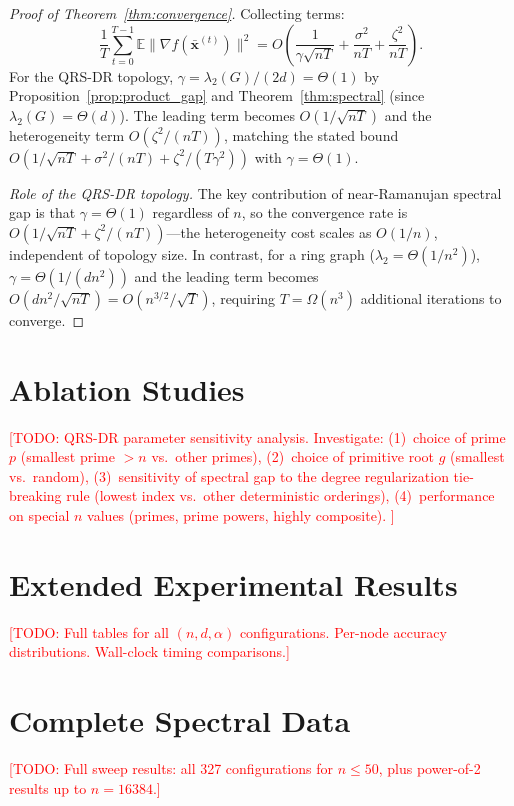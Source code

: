 \documentclass{article}
\newcommand{\E}{\mathbb{E}}
\newcommand{\bx}{\mathbf{x}}
\newcommand{\lam}{\lambda_2}
\begin{document}
\begin{proof}[Proof of Theorem~\ref{thm:convergence}]
Collecting terms:
\[
\frac{1}{T}\sum_{t=0}^{T-1}\E\|\nabla f(\bar{\bx}^{(t)})\|^2
= O\!\left(\frac{1}{\gamma\sqrt{nT}} + \frac{\sigma^2}{nT}
+ \frac{\zeta^2}{nT}\right).
\]
For the QRS-DR topology, $\gamma = \lam(G)/(2d) = \Theta(1)$ by
Proposition~\ref{prop:product_gap} and Theorem~\ref{thm:spectral}
(since $\lam(G) = \Theta(d)$).  The leading term becomes
$O(1/\sqrt{nT})$ and the heterogeneity term $O(\zeta^2/(nT))$,
matching the stated bound $O(1/\sqrt{nT} + \sigma^2/(nT) +
\zeta^2/(T\gamma^2))$ with $\gamma = \Theta(1)$.

\emph{Role of the QRS-DR topology.}
The key contribution of near-Ramanujan spectral gap is that
$\gamma = \Theta(1)$ regardless of $n$, so the convergence rate
is $O(1/\sqrt{nT} + \zeta^2/(nT))$---the heterogeneity cost
scales as $O(1/n)$, independent of topology size.
In contrast, for a ring graph ($\lam = \Theta(1/n^2)$),
$\gamma = \Theta(1/(dn^2))$ and the leading term becomes
$O(dn^2/\sqrt{nT}) = O(n^{3/2}/\sqrt{T})$,
requiring $T = \Omega(n^3)$ additional iterations to converge.
\end{proof}

\section{Ablation Studies}
\label{app:ablation}
\textcolor{red}{[TODO: QRS-DR parameter sensitivity analysis.  Investigate:
(1)~choice of prime $p$ (smallest prime $> n$ vs.\ other primes),
(2)~choice of primitive root $g$ (smallest vs.\ random),
(3)~sensitivity of spectral gap to the degree regularization
tie-breaking rule (lowest index vs.\ other deterministic orderings),
(4)~performance on special $n$ values (primes, prime powers, highly composite).
]}

\section{Extended Experimental Results}
\label{app:extended}
\textcolor{red}{[TODO: Full tables for all $(n, d, \alpha)$ configurations.
Per-node accuracy distributions.  Wall-clock timing comparisons.]}

\section{Complete Spectral Data}
\label{app:spectral_data}
\textcolor{red}{[TODO: Full sweep results: all 327 configurations for
$n \le 50$, plus power-of-2 results up to $n = 16384$.]}
\end{document}
